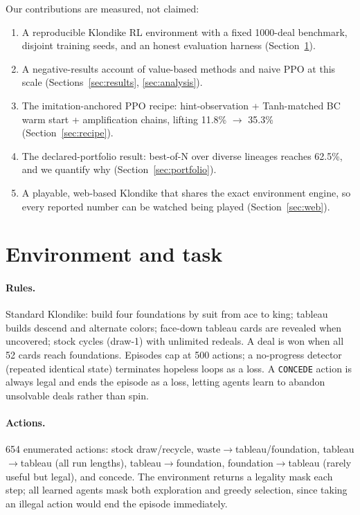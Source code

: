 \documentclass[11pt]{article}
\begin{document}
Our contributions are measured, not claimed:
\begin{enumerate}
\item A reproducible Klondike RL environment with a fixed 1000-deal
  benchmark, disjoint training seeds, and an honest evaluation harness
  (Section~\ref{sec:env}).
\item A negative-results account of value-based methods and naive PPO at
  this scale (Sections~\ref{sec:results}, \ref{sec:analysis}).
\item The imitation-anchored PPO recipe: hint-observation + Tanh-matched
  BC warm start + amplification chains, lifting 11.8\% $\to$ 35.3\%
  (Section~\ref{sec:recipe}).
\item The declared-portfolio result: best-of-N over diverse lineages
  reaches 62.5\%, and we quantify why (Section~\ref{sec:portfolio}).
\item A playable, web-based Klondike that shares the exact environment
  engine, so every reported number can be watched being played
  (Section~\ref{sec:web}).
\end{enumerate}

\section{Environment and task}\label{sec:env}
\paragraph{Rules.} Standard Klondike: build four foundations by suit from
ace to king; tableau builds descend and alternate colors; face-down
tableau cards are revealed when uncovered; stock cycles (draw-1) with
unlimited redeals. A deal is won when all 52 cards reach foundations.
Episodes cap at 500 actions; a no-progress detector (repeated identical
state) terminates hopeless loops as a loss. A \texttt{CONCEDE} action is
always legal and ends the episode as a loss, letting agents learn to
abandon unsolvable deals rather than spin.

\paragraph{Actions.} 654 enumerated actions: stock draw/recycle,
waste$\to$tableau/foundation, tableau$\to$tableau (all run lengths),
tableau$\to$foundation, foundation$\to$tableau (rarely useful but legal),
and concede. The environment returns a legality mask each step; all
learned agents mask both exploration and greedy selection, since taking
an illegal action would end the episode immediately.
\end{document}
